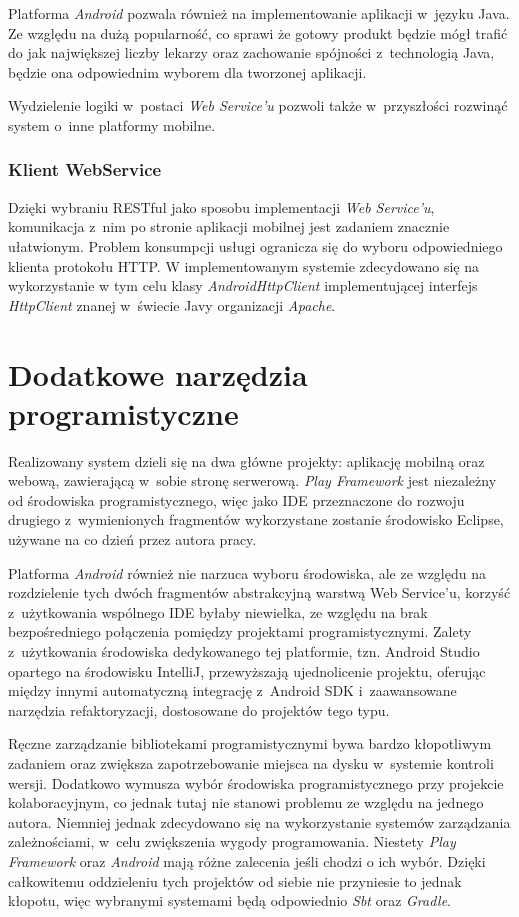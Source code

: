 \documentclass[11pt]{aghdpl}
\begin{document}
Platforma \emph{Android} pozwala również na implementowanie aplikacji w~języku Java. Ze względu na dużą popularność, co sprawi że gotowy produkt będzie mógł trafić do jak największej liczby lekarzy oraz zachowanie spójności z~technologią Java, będzie ona odpowiednim wyborem dla tworzonej aplikacji.

Wydzielenie logiki w~postaci \emph{Web Service'u} pozwoli także w~przyszłości rozwinąć system o~inne platformy mobilne.

\subsubsection{Klient WebService}

Dzięki wybraniu RESTful jako sposobu implementacji \emph{Web Service'u}, komunikacja z~nim po stronie aplikacji mobilnej jest zadaniem znacznie ułatwionym. Problem konsumpcji usługi ogranicza się do wyboru odpowiedniego klienta protokołu HTTP. W implementowanym systemie zdecydowano się na wykorzystanie w tym celu klasy \emph{AndroidHttpClient} implementującej interfejs \emph{HttpClient} znanej w~świecie Javy organizacji \emph{Apache}.

\section{Dodatkowe narzędzia programistyczne}

Realizowany system dzieli się na dwa główne projekty: aplikację mobilną oraz webową, zawierającą w~sobie stronę serwerową. \emph{Play Framework} jest niezależny od środowiska programistycznego, więc jako IDE przeznaczone do rozwoju drugiego z~wymienionych fragmentów wykorzystane zostanie środowisko Eclipse, używane na co dzień przez autora pracy.

Platforma \emph{Android} również nie narzuca wyboru środowiska, ale ze względu na rozdzielenie tych dwóch fragmentów abstrakcyjną warstwą Web Service'u, korzyść z~użytkowania wspólnego IDE byłaby niewielka, ze względu na brak bezpośredniego połączenia pomiędzy projektami programistycznymi. Zalety z~użytkowania środowiska dedykowanego tej platformie, tzn. Android Studio opartego na środowisku IntelliJ, przewyższają ujednolicenie projektu, oferując między innymi automatyczną integrację z~Android SDK i~zaawansowane narzędzia refaktoryzacji, dostosowane do projektów tego typu.

Ręczne zarządzanie bibliotekami programistycznymi bywa bardzo kłopotliwym zadaniem oraz zwiększa zapotrzebowanie miejsca na dysku w~systemie kontroli wersji. Dodatkowo wymusza wybór środowiska programistycznego przy projekcie kolaboracyjnym, co jednak tutaj nie stanowi problemu ze względu na jednego autora. Niemniej jednak zdecydowano się na wykorzystanie systemów zarządzania zależnościami, w~celu zwiększenia wygody programowania. Niestety \emph{Play Framework} oraz \emph{Android} mają różne zalecenia jeśli chodzi o ich wybór. Dzięki całkowitemu oddzieleniu tych projektów od siebie nie przyniesie to jednak kłopotu, więc wybranymi systemami będą odpowiednio \emph{Sbt} oraz \emph{Gradle}.
\end{document}
